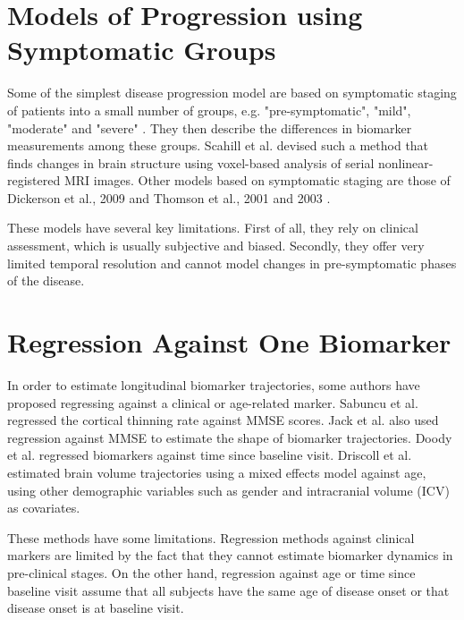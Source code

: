 \section{Models of Progression using Symptomatic Groups}
\label{sec:bckDpmSym}

Some of the simplest disease progression model are based on symptomatic staging of patients into a small number of groups, e.g. "pre-symptomatic", "mild", "moderate" and "severe" \cite{fonteijn2012event}. They then describe the differences in biomarker measurements among these groups. Scahill et al. \cite{scahill2002mapping} devised such a method that finds changes in brain structure using voxel-based analysis of serial nonlinear-registered MRI images. Other models based on symptomatic staging are those of Dickerson et al., 2009 \cite{dickerson2009cortical} and Thomson et al., 2001 \cite{thompson2001cortical} and 2003 \cite{thompson2003dynamics}. 

These models have several key limitations. First of all, they rely on clinical assessment, which is usually subjective and biased. Secondly, they offer very limited temporal resolution and cannot model changes in pre-symptomatic phases of the disease.   

\section{Regression Against One Biomarker}
\label{sec:bckDpmReg}

In order to estimate longitudinal biomarker trajectories, some authors have proposed regressing against a clinical or age-related marker.  Sabuncu et al. \cite{sabuncu2011dynamics} regressed the cortical thinning rate against MMSE scores. Jack et al. \cite{jack2012shapes} also used regression against MMSE to estimate the shape of biomarker trajectories. Doody et al. \cite{doody2010predicting} regressed biomarkers against time since baseline visit. Driscoll et al. \cite{driscoll2009longitudinal} estimated brain volume trajectories using a mixed effects model against age, using other demographic variables such as gender and intracranial volume (ICV) as covariates. 

These methods have some limitations. Regression methods against clinical markers are limited by the fact that they cannot estimate biomarker dynamics in pre-clinical stages. On the other hand, regression against age or time since baseline visit assume that all subjects have the same age of disease onset or that disease onset is at baseline visit.

